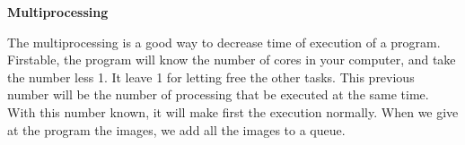 \textbf{Multiprocessing}

The multiprocessing is a good way to decrease time of execution of a program. Firstable, the program will know the number of cores in your computer, and take the number less 1. It leave 1 for letting free the other tasks.
This previous number will be the number of processing that be executed at the same time. With this number known, it will make first the execution normally. When we give at the program the images, we add all the images to a queue.  
  